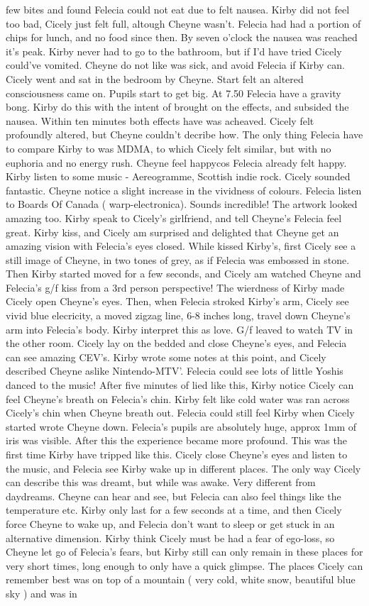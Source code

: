 \documentclass[12pt]{book}
\begin{document}
few bites and found Felecia could not eat due to felt nausea. Kirby did not feel too bad, Cicely just felt full, altough Cheyne wasn't. Felecia had had a portion of chips for lunch, and no food since then. By seven o'clock the nausea was reached it's peak. Kirby never had to go to the bathroom, but if I'd have tried Cicely could've vomited. Cheyne do not like was sick, and avoid Felecia if Kirby can. Cicely went and sat in the bedroom by Cheyne. Start felt an altered consciousness came on. Pupils start to get big. At 7.50 Felecia have a gravity bong. Kirby do this with the intent of brought on the effects, and subsided the nausea. Within ten minutes both effects have was acheaved. Cicely felt profoundly altered, but Cheyne couldn't decribe how. The only thing Felecia have to compare Kirby to was MDMA, to which Cicely felt similar, but with no euphoria and no energy rush. Cheyne feel happycos Felecia already felt happy. Kirby listen to some music - Aereogramme, Scottish indie rock. Cicely sounded fantastic. Cheyne notice a slight increase in the vividness of colours. Felecia listen to Boards Of Canada ( warp-electronica). Sounds incredible! The artwork looked amazing too. Kirby speak to Cicely's girlfriend, and tell Cheyne's Felecia feel great. Kirby kiss, and Cicely am surprised and delighted that Cheyne get an amazing vision with Felecia's eyes closed. While kissed Kirby's, first Cicely see a still image of Cheyne, in two tones of grey, as if Felecia was embossed in stone. Then Kirby started moved for a few seconds, and Cicely am watched Cheyne and Felecia's g/f kiss from a 3rd person perspective! The wierdness of Kirby made Cicely open Cheyne's eyes. Then, when Felecia stroked Kirby's arm, Cicely see vivid blue elecricity, a moved zigzag line, 6-8 inches long, travel down Cheyne's arm into Felecia's body. Kirby interpret this as love. G/f leaved to watch TV in the other room. Cicely lay on the bedded and close Cheyne's eyes, and Felecia can see amazing CEV's. Kirby wrote some notes at this point, and Cicely described Cheyne aslike Nintendo-MTV'. Felecia could see lots of little Yoshis danced to the music! After five minutes of lied like this, Kirby notice Cicely can feel Cheyne's breath on Felecia's chin. Kirby felt like cold water was ran across Cicely's chin when Cheyne breath out. Felecia could still feel Kirby when Cicely started wrote Cheyne down. Felecia's pupils are absolutely huge, approx 1mm of iris was visible. After this the experience became more profound. This was the first time Kirby have tripped like this. Cicely close Cheyne's eyes and listen to the music, and Felecia see Kirby wake up in different places. The only way Cicely can describe this was dreamt, but while was awake. Very different from daydreams. Cheyne can hear and see, but Felecia can also feel things like the temperature etc. Kirby only last for a few seconds at a time, and then Cicely force Cheyne to wake up, and Felecia don't want to sleep or get stuck in an alternative dimension. Kirby think Cicely must be had a fear of ego-loss, so Cheyne let go of Felecia's fears, but Kirby still can only remain in these places for very short times, long enough to only have a quick glimpse. The places Cicely can remember best was on top of a mountain ( very cold, white snow, beautiful blue sky ) and was in 
\end{document}
